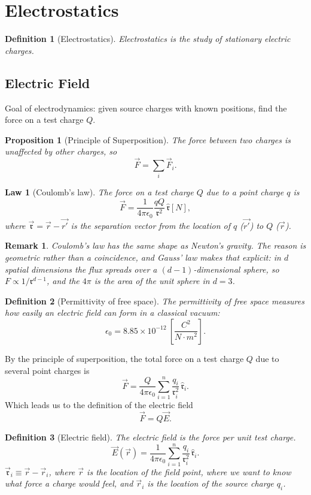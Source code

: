 \documentclass{article}
\newtheorem{law}{Law}
\newtheorem{definition}{Definition}
\newtheorem{remark}{Remark}
\newtheorem{proposition}{Proposition}
\begin{document}
\section{Electrostatics}
\begin{definition}[Electrostatics]
    Electrostatics is the study of stationary electric charges.
\end{definition}

\subsection{Electric Field}
Goal of electrodynamics: given source charges with known positions, find the force on a test charge $Q$.
\begin{proposition}[Principle of Superposition]
    \label{Superposition}
    The force between two charges is unaffected by other charges, so
    \[\vec{F} = \sum_i \vec{F}_i.\]
\end{proposition}
\begin{law}[Coulomb's law]
    The force on a test charge $Q$ due to a point charge $q$ is
    \begin{equation}
        \vec{F} = \frac{1}{4\pi\epsilon_0}\frac{qQ}{\mathfrak{r}^2}\,\hat{\mathfrak{r}} \left[N\right],
    \end{equation}
    where $\vec{\mathfrak{r}} = \vec{r} - \vec{r'}$ is the separation vector from the location of $q$ ($\vec{r'}$) to $Q$ ($\vec{r}$).
\end{law}
\begin{remark}
    Coulomb's law has the same shape as Newton's gravity. The reason is geometric rather than a coincidence, and Gauss' law makes that explicit: in $d$ spatial dimensions the flux spreads over a $(d-1)$-dimensional sphere, so $F\propto 1/\mathfrak{r}^{d-1}$, and the $4\pi$ is the area of the unit sphere in $d=3$.
\end{remark}
\begin{definition}[Permittivity of free space]
    The permittivity of free space measures how easily an electric field can form in a classical vacuum:
    \[\epsilon_0 = 8.85 \times 10^{-12}\ \left[\frac{C^2}{N\cdot m^2}\right].\]
\end{definition}
By the principle of superposition, the total force on a test charge $Q$ due to several point charges is
\[\vec{F} = \frac{Q}{4\pi\epsilon_0}\sum_{i=1}^{n}\frac{q_i}{\mathfrak{r}_i^2}\,\hat{\mathfrak{r}}_i.\]
Which leads us to the definition of the electric field
\[\vec{F} = Q\vec{E}.\]
\begin{definition}[Electric field]
    The electric field is the force per unit test charge.
    \begin{equation}
        \vec{E}(\vec{r}) = \frac{1}{4\pi\epsilon_0}\sum_{i=1}^{n}\frac{q_i}{\mathfrak{r}_i^2}\,\hat{\mathfrak{r}}_i.
    \end{equation}
    $\vec{\mathfrak{r}}_i \equiv \vec{r} - \vec{r}_i$, where $\vec{r}$ is the location of the field point, where we want to know what force a charge would feel, and $\vec{r}_i$ is the location of the source charge $q_i$.
\end{definition}
\end{document}
